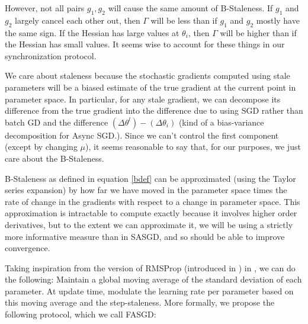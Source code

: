 \documentclass{article} %
\begin{document}
However, not all pairs $g_1, g_2$ will cause the same amount of B-Staleness.
If $g_1$ and $g_2$ largely cancel each other out, then $\Gamma$ will be less than if $g_1$ and $g_2$ mostly have the same sign.
If the Hessian has large values at $\theta_i$, then $\Gamma$ will be higher than if the Hessian has small values.
It seems wise to account for these things in our synchronization protocol.

We care about staleness because the stochastic gradients computed using stale parameters will be a biased estimate
of the true gradient at the current point in parameter space.
In particular, for any stale gradient, we can decompose its difference from the true gradient
into the difference due to using SGD rather than batch GD and the difference $(\Delta \theta^l) - (\Delta \theta_i)$
(kind of a bias-variance decomposition for Async SGD.).
Since we can't control the first component (except by changing $\mu$),
it seems reasonable to say that, for our purposes, we just care about the B-Staleness.

B-Staleness as defined in equation \ref{bdef} can be approximated (using the Taylor series expansion)
by how far we have moved in the parameter space times the rate of change
in the gradients with respect to a change in parameter space.
This approximation is intractable to compute exactly because it involves higher order derivatives,
but to the extent we can approximate it,
we will be using a strictly more informative measure than in SASGD, and so should be able to improve convergence.

Taking inspiration from the version of RMSProp (introduced in \cite{RMSPROP}) in \cite{Graves}, we can do the following:
Maintain a global moving average of the standard deviation of each parameter.
At update time, modulate the learning rate per parameter based on this moving average and the step-staleness.
More formally, we propose the following protocol, which we call FASGD:
\end{document}
